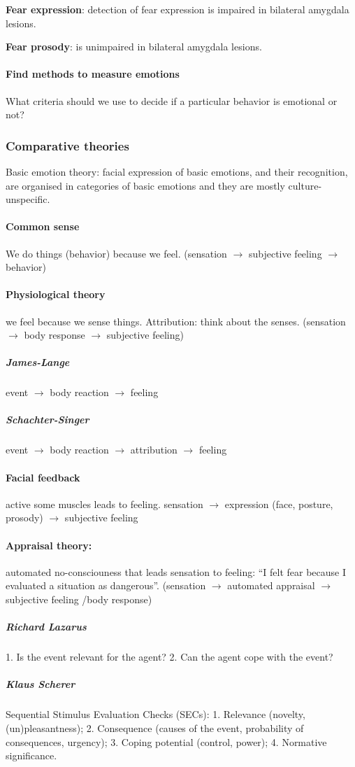 \documentclass[12pt,article,oneside,a4paper]{memoir}
\begin{document}
\textbf{Fear expression}: detection of fear expression is impaired in bilateral
amygdala lesions.

\textbf{Fear prosody}: is unimpaired in bilateral amygdala lesions.

\paragraph{Find methods to measure emotions}
What criteria should we use to decide if a particular behavior is emotional or
not?

\subsubsection{Comparative theories}
Basic emotion theory: facial expression of basic emotions, and their
recognition, are organised in categories of basic emotions and they are mostly
culture-unspecific.

\paragraph{Common sense}
We do things (behavior) because we feel.
(sensation $\rightarrow$ subjective feeling $\rightarrow$ behavior)
\paragraph{Physiological theory}
we feel because we sense things. Attribution: think about the senses.
(sensation $\rightarrow$ body response $\rightarrow$ subjective feeling)
\subparagraph{James-Lange} event $\rightarrow$ body reaction $\rightarrow$
feeling
\subparagraph{Schachter-Singer} event $\rightarrow$ body reaction $\rightarrow$
attribution $\rightarrow$ feeling
\paragraph{Facial feedback} active some muscles leads to feeling. sensation
$\rightarrow$ expression (face, posture, prosody) $\rightarrow$ subjective
feeling
\paragraph{Appraisal theory:} automated no-consciouness that leads sensation to
feeling: ``I felt fear because I evaluated a situation as dangerous''.
(sensation $\rightarrow$ automated appraisal $\rightarrow$ subjective feeling
/body response)
\subparagraph{Richard Lazarus} 1. Is the event relevant for the agent? 2.
Can the agent cope with the event?
\subparagraph{Klaus Scherer} Sequential Stimulus Evaluation Checks (SECs):
1. Relevance (novelty, (un)pleasantness); 2. Consequence (causes of the event,
probability of consequences, urgency); 3. Coping potential (control, power);
4. Normative significance.
\end{document}

